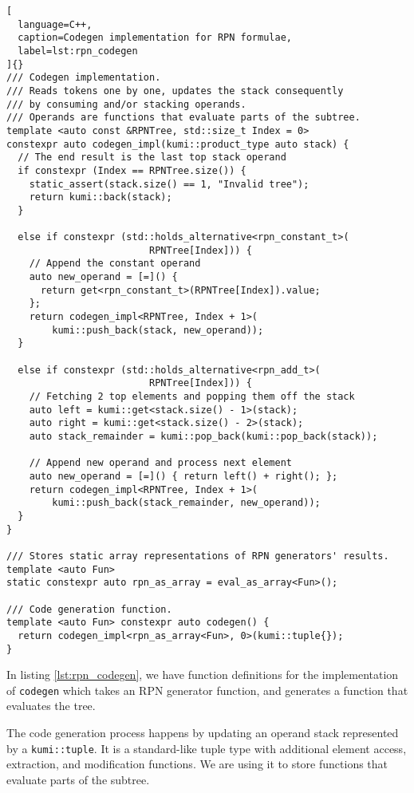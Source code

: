 \documentclass[../main]{subfiles}
\begin{document}
\begin{lstlisting}[
  language=C++,
  caption=Codegen implementation for RPN formulae,
  label=lst:rpn_codegen
]{}
/// Codegen implementation.
/// Reads tokens one by one, updates the stack consequently
/// by consuming and/or stacking operands.
/// Operands are functions that evaluate parts of the subtree.
template <auto const &RPNTree, std::size_t Index = 0>
constexpr auto codegen_impl(kumi::product_type auto stack) {
  // The end result is the last top stack operand
  if constexpr (Index == RPNTree.size()) {
    static_assert(stack.size() == 1, "Invalid tree");
    return kumi::back(stack);
  }

  else if constexpr (std::holds_alternative<rpn_constant_t>(
                         RPNTree[Index])) {
    // Append the constant operand
    auto new_operand = [=]() {
      return get<rpn_constant_t>(RPNTree[Index]).value;
    };
    return codegen_impl<RPNTree, Index + 1>(
        kumi::push_back(stack, new_operand));
  }

  else if constexpr (std::holds_alternative<rpn_add_t>(
                         RPNTree[Index])) {
    // Fetching 2 top elements and popping them off the stack
    auto left = kumi::get<stack.size() - 1>(stack);
    auto right = kumi::get<stack.size() - 2>(stack);
    auto stack_remainder = kumi::pop_back(kumi::pop_back(stack));

    // Append new operand and process next element
    auto new_operand = [=]() { return left() + right(); };
    return codegen_impl<RPNTree, Index + 1>(
        kumi::push_back(stack_remainder, new_operand));
  }
}

/// Stores static array representations of RPN generators' results.
template <auto Fun>
static constexpr auto rpn_as_array = eval_as_array<Fun>();

/// Code generation function.
template <auto Fun> constexpr auto codegen() {
  return codegen_impl<rpn_as_array<Fun>, 0>(kumi::tuple{});
}
\end{lstlisting}

In listing \ref{lst:rpn_codegen}, we have function definitions for the
implementation of \lstinline{codegen} which takes an RPN generator function,
and generates a function that evaluates the tree.

The code generation process happens by updating an operand stack represented
by a \lstinline{kumi::tuple}. It is a standard-like tuple type with additional
element access, extraction, and modification functions.
We are using it to store functions that evaluate parts of the subtree.
\end{document}
